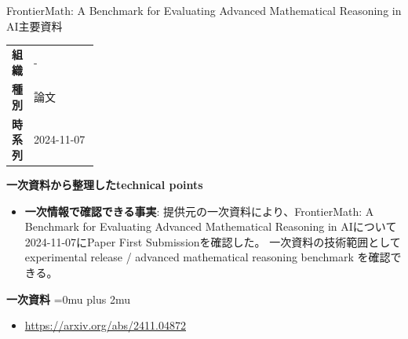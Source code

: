 \begin{technicalnote}{FrontierMath: A Benchmark for Evaluating Advanced Mathematical Reasoning in AI}{主要資料}
\begingroup
\begin{tabularx}{\linewidth}{@{}>{\bfseries}p{0.22\linewidth}X@{}}
組織 & - \\
種別 & 論文 \\
時系列 & 2024-11-07 \\
\end{tabularx}
\smallskip
{\bfseries 一次資料から整理したtechnical points}
\begin{itemize}[leftmargin=1.5em,itemsep=0.35em]
\item \textbf{一次情報で確認できる事実}: 提供元の一次資料により、FrontierMath: A Benchmark for Evaluating Advanced Mathematical Reasoning in AIについて2024-11-07にPaper First Submissionを確認した。 一次資料の技術範囲として experimental release / advanced mathematical reasoning benchmark を確認できる。
\end{itemize}
\begin{minipage}{\linewidth}
\begin{samepage}
{\bfseries 一次資料}
\begingroup\sloppy
\Urlmuskip=0mu plus 2mu\relax
\begin{itemize}[leftmargin=1.5em,itemsep=0.25em]
\item {\scriptsize\url{https://arxiv.org/abs/2411.04872}}
\end{itemize}
\endgroup
\end{samepage}
\end{minipage}
\endgroup
\end{technicalnote}
\medskip

